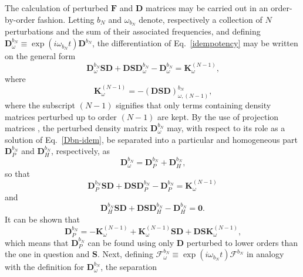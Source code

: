 \documentclass[%
 reprint,
 amsmath,amssymb,
 aps,
]{revtex4-1}
\begin{document}
The calculation of perturbed $\mathbf{F}$ and $\mathbf{D}$ matrices may be carried out in an order-by-order fashion. Letting $b_{N}$ and $\omega_{b_{N}}$ denote, respectively a collection of $N$ perturbations and the sum of their associated frequencies, and defining $\mathbf{D}^{b_N}_{\omega} \equiv \exp{\left( i \omega_{b_{N}} t \right)}\mathbf{D}^{b_N}$, the differentiation of Eq.~\eqref{idempotency} may be written on the general form
\begin{equation}\label{Dbn-idem}
\mathbf{D}^{b_N}_{\omega} \mathbf{S} \mathbf{D} + \mathbf{D} \mathbf{S} \mathbf{D}^{b_N}_{\omega} - \mathbf{D}^{b_N}_{\omega} = 
\mathbf{K}^{(N-1)}_{\omega} \text{,}
\end{equation}
where
\begin{equation}\label{Knminus1}
\mathbf{K}^{(N-1)}_{\omega} = - (\mathbf{DSD})^{b_N}_{\omega,(N-1)}\text{,}
\end{equation}
where the subscript $(N - 1)$ signifies that only terms containing density matrices  perturbed up to order $(N - 1)$ are kept. By the use of projection matrices , the perturbed density matrix $\mathbf{D}^{b_N}_{\omega}$ may, with respect to its role as a solution of Eq.~\eqref{Dbn-idem}, be separated into a particular and homogeneous part $\mathbf{D}_{P}^{b_N}$ and $\mathbf{D}_{H}^{b_N}$, respectively, as
\begin{equation}\label{D-partitioning}
\mathbf{D}^{b_N}_{\omega} =  
\mathbf{D}_{P}^{b_N} + \mathbf{D}_{H}^{b_N}\text{,}
\end{equation}
so that
\begin{equation}\label{Particular-equation}
\mathbf{D}^{b_N}_P \mathbf{S} \mathbf{D} + \mathbf{D} \mathbf{S} \mathbf{D}^{b_N}_P - \mathbf{D}^{b_N}_{P} = 
\mathbf{K}^{(N-1)}_{\omega}
\end{equation}
and
\begin{equation}\label{Homogeneous-equation}
\mathbf{D}^{b_N}_H \mathbf{S} \mathbf{D} + \mathbf{D} \mathbf{S} \mathbf{D}^{b_N}_H - \mathbf{D}^{b_N}_{H} = 
\mathbf{0} \text{.}
\end{equation}
It can be shown that
\begin{equation}\label{Particular-final}
\mathbf{D}^{b_N}_P = - \mathbf{K}^{(N-1)}_{\omega} + \mathbf{K}^{(N-1)}_{\omega} \mathbf{S} \mathbf{D} + \mathbf{D} \mathbf{S} \mathbf{K}^{(N-1)}_{\omega} \text{,}
\end{equation}
which means that $\mathbf{D}^{b_N}_P$ can be found using only $\mathbf{D}$ perturbed to lower orders than the one in question and $\mathbf{S}$. Next, defining $\bm{\mathcal{F}}^{b_{N}}_{\omega} \equiv \exp{\left(i \omega_{b_{N}} t\right)}\bm{\mathcal{F}}^{b_{N}}$ in analogy with the definition for $\mathbf{D}^{b_N}_{\omega}$, the separation
\end{document}
